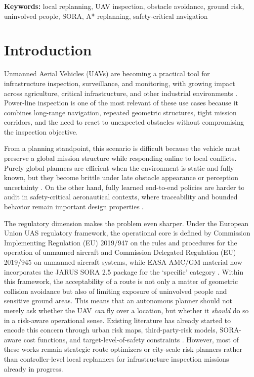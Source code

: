 \documentclass[a4paper,11pt]{article}
\begin{document}
\noindent\textbf{Keywords:} local replanning, UAV inspection, obstacle avoidance, ground risk, uninvolved people, SORA, A* replanning, safety-critical navigation

\section{Introduction}

Unmanned Aerial Vehicles (UAVs) are becoming a practical tool for infrastructure inspection, surveillance, and monitoring, with growing impact across agriculture, critical infrastructure, and other industrial environments \cite{imran2025environmental,marut2024surveillance}. Power-line inspection is one of the most relevant of these use cases because it combines long-range navigation, repeated geometric structures, tight mission corridors, and the need to react to unexpected obstacles without compromising the inspection objective.

From a planning standpoint, this scenario is difficult because the vehicle must preserve a global mission structure while responding online to local conflicts. Purely global planners are efficient when the environment is static and fully known, but they become brittle under late obstacle appearance or perception uncertainty \cite{debnath2024review,meng2025advances}. On the other hand, fully learned end-to-end policies are harder to audit in safety-critical aeronautical contexts, where traceability and bounded behavior remain important design properties \cite{EASA_AI_Roadmap_2.0}.

The regulatory dimension makes the problem even sharper. Under the European Union UAS regulatory framework, the operational core is defined by Commission Implementing Regulation (EU) 2019/947 on the rules and procedures for the operation of unmanned aircraft and Commission Delegated Regulation (EU) 2019/945 on unmanned aircraft systems, while EASA AMC/GM material now incorporates the JARUS SORA 2.5 package for the `specific' category \cite{EU2019_947,EU2019_945,JARUS_SORA_2_5_2024,EASA_AMC_GM_SORA25_2025}. Within this framework, the acceptability of a route is not only a matter of geometric collision avoidance but also of limiting exposure of uninvolved people and sensitive ground areas. This means that an autonomous planner should not merely ask whether the UAV \emph{can} fly over a location, but whether it \emph{should} do so in a risk-aware operational sense. Existing literature has already started to encode this concern through urban risk maps, third-party-risk models, SORA-aware cost functions, and target-level-of-safety constraints \cite{primatesta2019riskaware,primatesta2020groundrisk,pang2022integrated,tang2023thirdparty,zhang2023groundrisk,heinze2023sora,brassel2025riskaware}. However, most of these works remain strategic route optimizers or city-scale risk planners rather than controller-level local replanners for infrastructure inspection missions already in progress.
\end{document}
